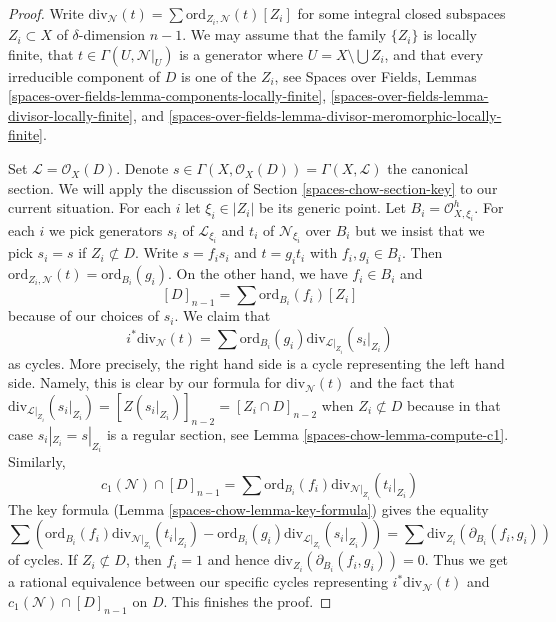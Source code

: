 \begin{proof}
Write $\text{div}_\mathcal{N}(t) = \sum \text{ord}_{Z_i, \mathcal{N}}(t)[Z_i]$
for some integral closed subspaces $Z_i \subset X$ of $\delta$-dimension
$n - 1$. We may assume that the family $\{Z_i\}$ is locally
finite, that $t \in \Gamma(U, \mathcal{N}|_U)$ is a generator
where $U = X \setminus \bigcup Z_i$, and that every irreducible component
of $D$ is one of the $Z_i$, see
Spaces over Fields, Lemmas
\ref{spaces-over-fields-lemma-components-locally-finite},
\ref{spaces-over-fields-lemma-divisor-locally-finite}, and
\ref{spaces-over-fields-lemma-divisor-meromorphic-locally-finite}.

\medskip\noindent
Set $\mathcal{L} = \mathcal{O}_X(D)$. Denote
$s \in \Gamma(X, \mathcal{O}_X(D)) = \Gamma(X, \mathcal{L})$
the canonical section. We will apply the discussion of
Section \ref{spaces-chow-section-key} to our current situation.
For each $i$ let $\xi_i \in |Z_i|$ be its generic point. Let
$B_i = \mathcal{O}_{X, \xi_i}^h$. For each $i$ we pick generators
$s_i$ of $\mathcal{L}_{\xi_i}$ and $t_i$ of $\mathcal{N}_{\xi_i}$
over $B_i$ but we insist that we pick $s_i = s$ if $Z_i \not \subset D$.
Write $s = f_i s_i$ and $t = g_i t_i$ with $f_i, g_i \in B_i$.
Then $\text{ord}_{Z_i, \mathcal{N}}(t) = \text{ord}_{B_i}(g_i)$.
On the other hand, we have $f_i \in B_i$ and
$$
[D]_{n - 1} = \sum \text{ord}_{B_i}(f_i)[Z_i]
$$
because of our choices of $s_i$. We claim that
$$
i^*\text{div}_\mathcal{N}(t) =
\sum \text{ord}_{B_i}(g_i) \text{div}_{\mathcal{L}|_{Z_i}}(s_i|_{Z_i})
$$
as cycles. More precisely, the right hand side is a cycle
representing the left hand side. Namely, this is clear by our
formula for $\text{div}_\mathcal{N}(t)$ and the fact that
$\text{div}_{\mathcal{L}|_{Z_i}}(s_i|_{Z_i}) = [Z(s_i|_{Z_i})]_{n - 2} =
[Z_i \cap D]_{n - 2}$ when $Z_i \not \subset D$ because in
that case $s_i|_{Z_i} = s|_{Z_i}$ is a regular section, see
Lemma \ref{spaces-chow-lemma-compute-c1}. Similarly,
$$
c_1(\mathcal{N}) \cap [D]_{n - 1} =
\sum \text{ord}_{B_i}(f_i) \text{div}_{\mathcal{N}|_{Z_i}}(t_i|_{Z_i})
$$
The key formula (Lemma \ref{spaces-chow-lemma-key-formula}) gives the equality
$$
\sum \left(
\text{ord}_{B_i}(f_i) \text{div}_{\mathcal{N}|_{Z_i}}(t_i|_{Z_i}) -
\text{ord}_{B_i}(g_i) \text{div}_{\mathcal{L}|_{Z_i}}(s_i|_{Z_i}) \right) =
\sum \text{div}_{Z_i}(\partial_{B_i}(f_i, g_i))
$$
of cycles. If $Z_i \not \subset D$, then $f_i = 1$ and hence
$\text{div}_{Z_i}(\partial_{B_i}(f_i, g_i)) = 0$. Thus we get a rational
equivalence between our specific cycles representing
$i^*\text{div}_\mathcal{N}(t)$ and $c_1(\mathcal{N}) \cap [D]_{n - 1}$
on $D$. This finishes the proof.
\end{proof}

